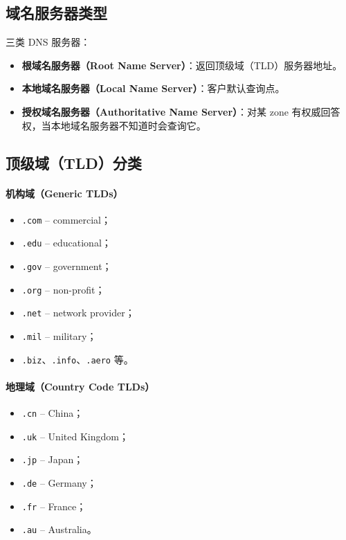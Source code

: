 \documentclass[UTF8,a4paper,11pt]{ctexart}
\begin{document}
\subsection{域名服务器类型}

三类 DNS 服务器：
\begin{itemize}
  \item \textbf{根域名服务器（Root Name Server）}：返回顶级域（TLD）服务器地址。
  \item \textbf{本地域名服务器（Local Name Server）}：客户默认查询点。
  \item \textbf{授权域名服务器（Authoritative Name Server）}：对某 zone 有权威回答权，当本地域名服务器不知道时会查询它。
\end{itemize}

\subsection{顶级域（TLD）分类}

\paragraph{机构域（Generic TLDs）}
\begin{itemize}
  \item \texttt{.com} -- commercial；
  \item \texttt{.edu} -- educational；
  \item \texttt{.gov} -- government；
  \item \texttt{.org} -- non-profit；
  \item \texttt{.net} -- network provider；
  \item \texttt{.mil} -- military；
  \item \texttt{.biz}、\texttt{.info}、\texttt{.aero} 等。
\end{itemize}

\paragraph{地理域（Country Code TLDs）}
\begin{itemize}
  \item \texttt{.cn} -- China；
  \item \texttt{.uk} -- United Kingdom；
  \item \texttt{.jp} -- Japan；
  \item \texttt{.de} -- Germany；
  \item \texttt{.fr} -- France；
  \item \texttt{.au} -- Australia。
\end{itemize}
\end{document}
